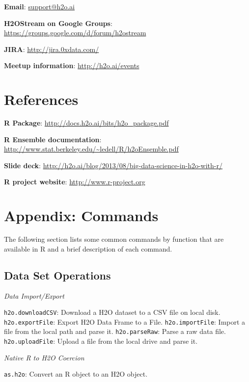 \documentclass[11pt]{article}
\begin{document}
{{\textbf{Email}}: {\url{support@h2o.ai}}

{\textbf{H2OStream on Google Groups}}: {\url{https://groups.google.com/d/forum/h2ostream}} 

{\textbf{JIRA}}: {\url{http://jira.0xdata.com/}}

{\textbf{Meetup information}}: {\url{http://h2o.ai/events}}

\newpage
\section{References}\bigskip


{\bfseries{R Package}}:  \url{http://docs.h2o.ai/bits/h2o\_package.pdf}

{\bfseries{R Ensemble documentation}}: \url{http://www.stat.berkeley.edu/~ledell/R/h2oEnsemble.pdf} 

{\bfseries{Slide deck}}: \url{http://h2o.ai/blog/2013/08/big-data-science-in-h2o-with-r/} 

{\bfseries{R project website}}: \url{http://www.r-project.org} 


\section{Appendix: Commands} \label{Appendix} 

The following section lists some common commands by function that are available in R and a brief description of each command. 
\subsection {Data Set Operations}
{\emph{Data Import/Export}}\par
{\texttt{h2o.downloadCSV}}: Download a H2O dataset to a CSV file on local disk.\newline
{\texttt{h2o.exportFile}}: Export H2O Data Frame to a File.\newline
{\texttt{h2o.importFile}}: Import a file from the local path and parse it.\newline
{\texttt{h2o.parseRaw}}: Parse a raw data file. \newline
{\texttt{h2o.uploadFile}}: Upload a file from the local drive and parse it.\newline

{\emph{Native R to H2O Coercion}}\par
 {\texttt{as.h2o}}: Convert an R object to an H2O object.\newline


}
\end{document}
